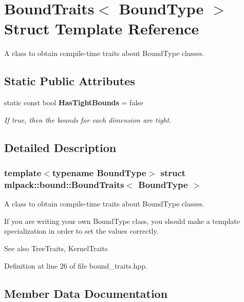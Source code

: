 \section{Bound\+Traits$<$ Bound\+Type $>$ Struct Template Reference}
\label{structmlpack_1_1bound_1_1BoundTraits}


A class to obtain compile-\/time traits about Bound\+Type classes.  


\subsection*{Static Public Attributes}
\begin{DoxyCompactItemize}
\item 
static const bool \textbf{ Has\+Tight\+Bounds} = false
\begin{DoxyCompactList}\small\item\em If true, then the bounds for each dimension are tight. \end{DoxyCompactList}\end{DoxyCompactItemize}


\subsection{Detailed Description}
\subsubsection*{template$<$typename Bound\+Type$>$\newline
struct mlpack\+::bound\+::\+Bound\+Traits$<$ Bound\+Type $>$}

A class to obtain compile-\/time traits about Bound\+Type classes. 

If you are writing your own Bound\+Type class, you should make a template specialization in order to set the values correctly.

\begin{DoxySeeAlso}{See also}
Tree\+Traits, Kernel\+Traits 
\end{DoxySeeAlso}


Definition at line 26 of file bound\+\_\+traits.\+hpp.



\subsection{Member Data Documentation}
\mbox{\label{structmlpack_1_1bound_1_1BoundTraits_af41e456bf5ea6c0557730318fe660d2d}} 
